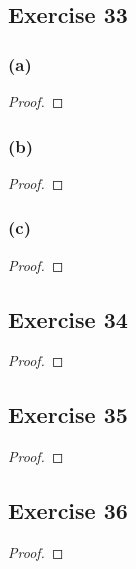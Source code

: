 \documentclass[14pt]{extarticle}
\begin{document}
\subsection{Exercise 33}

\subsubsection{(a)}

\begin{proof}

\end{proof}

\subsubsection{(b)}

\begin{proof}

\end{proof}

\subsubsection{(c)}

\begin{proof}

\end{proof}

\subsection{Exercise 34}

\begin{proof}

\end{proof}

\subsection{Exercise 35}

\begin{proof}

\end{proof}

\subsection{Exercise 36}

\begin{proof}

\end{proof}
\end{document}
